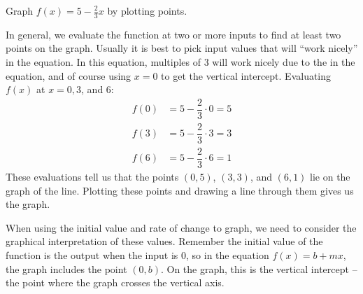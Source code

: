 \begin{example}
Graph $f(x) = 5 - \frac{2}{3} x$ by plotting points.

\begin{solution} In general, we evaluate the function at two or more inputs to find at least two points on the graph. Usually it is best to pick input values that will ``work nicely'' in the equation. In this equation, multiples of 3 will work nicely due to the in the equation, and of course using $x = 0$ to get the vertical intercept. Evaluating $f(x)$ at $x = 0, 3$, and $6$:
\begin{align*}
f(0) &= 5 - \dfrac{2}{3} \cdot 0 = 5 \\
f(3) &= 5 - \dfrac{2}{3} \cdot 3 = 3 \\
f(6) &= 5 - \dfrac{2}{3} \cdot 6 = 1
\end{align*}
These evaluations tell us that the points $(0,5)$, $(3,3)$, and $(6,1)$ lie on the graph of the line. Plotting these points and drawing a line through them gives us the graph.

\begin{center}
\end{center}

\end{solution}\end{example}

When using the initial value and rate of change to graph, we need to consider the graphical interpretation of these values. Remember the initial value of the function is the output when the input is $0$, so in the equation $f(x) = b + mx$, the graph includes the point $(0, b)$. On the graph, this is the vertical intercept -- the point where the graph crosses the vertical axis.

